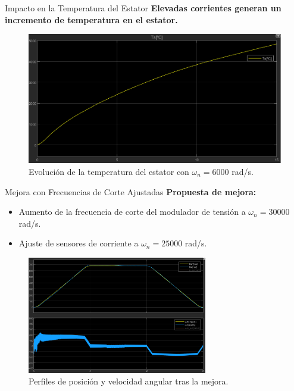 \documentclass[12pt]{beamer}
\begin{document}
\begin{frame}{Impacto en la Temperatura del Estator}
    \textbf{Elevadas corrientes generan un incremento de temperatura en el estator.}
    \begin{figure}
        \centering
        \includegraphics[width=1\textwidth]{Imagenes/Temperatura_Estator_ModuladorTNI.png}
        \caption{Evolución de la temperatura del estator con \(\omega_n = 6000\) rad/s.}
    \end{figure}
\end{frame}

\begin{frame}{Mejora con Frecuencias de Corte Ajustadas}
    \textbf{Propuesta de mejora:}
    \begin{itemize}
        \item Aumento de la frecuencia de corte del modulador de tensión a \(\omega_n = 30000\) rad/s.
        \item Ajuste de sensores de corriente a \(\omega_n = 25000\) rad/s.
    \end{itemize}

    \begin{figure}
        \centering
        \includegraphics[width=0.7\textwidth]{Imagenes/Posicion_Velocidad_ModuladorTNI.png}
        \caption{Perfiles de posición y velocidad angular tras la mejora.}
    \end{figure}
\end{frame}
\end{document}
